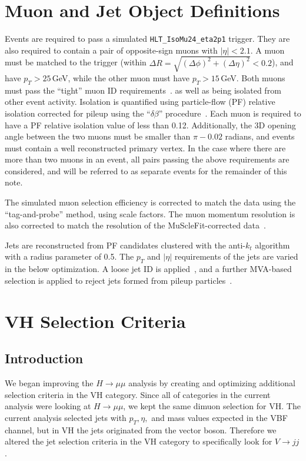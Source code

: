 \documentclass[12pt]{article}
\begin{document}
\section{Muon and Jet Object Definitions}

Events are required to pass a simulated \texttt{HLT\_IsoMu24\_eta2p1} trigger.
They are also required to contain a pair of opposite-sign muons with $|\eta|<2.1$.
A muon must be matched to the trigger (within $\Delta R = \sqrt{(\Delta \phi)^2+(\Delta \eta)^2}< 0.2$), 
and have $p_T>25$\,GeV, while the other muon must have $p_T>15$\,GeV.
Both muons must pass the ``tight'' muon ID requirements~\cite{AN2012_459}.
as well as being isolated from other event activity.  Isolation is quantified using
particle-flow (PF) relative isolation corrected for pileup using the ``$\delta \beta$''
procedure~\cite{AN2012_459}.  Each muon is required to have a PF relative isolation value
of less than 0.12.  Additionally, the 3D opening angle between the two muons must be
smaller than $\pi-0.02$ radians, and events must contain a well reconstructed primary
vertex.
In the case where there are more than two muons in an event, all pairs passing the above
requirements are considered, and will be referred to as separate events for the remainder
of this note.  

The simulated muon selection efficiency is corrected to match the data using 
the ``tag-and-probe'' method, using scale factors.  The muon momentum resolution
is also corrected to match the resolution of the MuScleFit-corrected data~\cite{AN2012_459}.

Jets are reconstructed from PF candidates clustered with the anti-$k_t$ algorithm with
a radius parameter of 0.5.  The $p_T$ and $|\eta|$ requirements of the jets are varied in
the below optimization.  A loose jet ID is applied~\cite{AN2012_459}, and a further
MVA-based selection is applied to reject jets formed from pileup particles~\cite{PUID}.

\section{VH Selection Criteria}

\subsection{Introduction}

We began improving the $H \rightarrow \mu \mu$ analysis by creating and optimizing additional selection criteria in the VH category. 
Since all of categories in the current analysis were looking at $H \rightarrow \mu \mu$, we kept the same dimuon selection for VH. 
The current analysis selected jets with $p_{T}, \eta,$ and mass values expected in the VBF channel, but in VH the jets originated from the vector boson. 
Therefore we altered the jet selection criteria in the VH category to specifically look for $V \rightarrow jj$.
\end{document}
